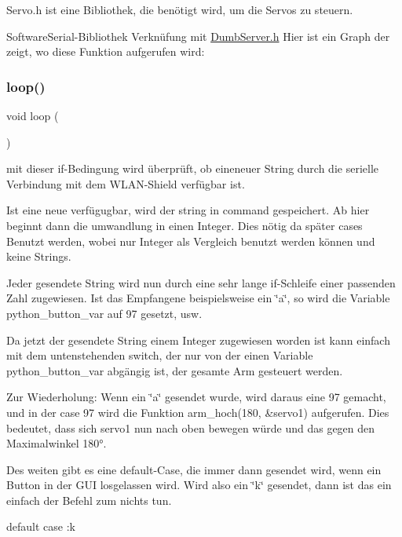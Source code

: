 Servo.\+h ist eine Bibliothek, die benötigt wird, um die Servos zu steuern. 

Software\+Serial-\/\+Bibliothek Verknüfung mit \hyperlink{_dumb_server_8h}{Dumb\+Server.\+h} Hier ist ein Graph der zeigt, wo diese Funktion aufgerufen wird\+:
\mbox{\label{_arduino__kommentiert_8ino_afe461d27b9c48d5921c00d521181f12f}} 
\subsubsection{\texorpdfstring{loop()}{loop()}}
{\footnotesize\ttfamily void loop (\begin{DoxyParamCaption}{ }\end{DoxyParamCaption})}

mit dieser if-\/\+Bedingung wird überprüft, ob eineneuer String durch die serielle Verbindung mit dem W\+L\+A\+N-\/\+Shield verfügbar ist.

Ist eine neue verfügugbar, wird der string in command gespeichert. Ab hier beginnt dann die umwandlung in einen Integer. Dies nötig da später cases Benutzt werden, wobei nur Integer als Vergleich benutzt werden können und keine Strings.

Jeder gesendete String wird nun durch eine sehr lange if-\/\+Schleife einer passenden Zahl zugewiesen. Ist das Empfangene beispielsweise ein \char`\"{}a\char`\"{}, so wird die Variable python\+\_\+button\+\_\+var auf 97 gesetzt, usw.

Da jetzt der gesendete String einem Integer zugewiesen worden ist kann einfach mit dem untenstehenden switch, der nur von der einen Variable python\+\_\+button\+\_\+var abgängig ist, der gesamte Arm gesteuert werden.

Zur Wiederholung\+: Wenn ein \char`\"{}a\char`\"{} gesendet wurde, wird daraus eine 97 gemacht, und in der case 97 wird die Funktion arm\+\_\+hoch(180, \&servo1) aufgerufen. Dies bedeutet, dass sich servo1 nun nach oben bewegen würde und das gegen den Maximalwinkel 180°.

Des weiten gibt es eine default-\/\+Case, die immer dann gesendet wird, wenn ein Button in der G\+UI losgelassen wird. Wird also ein \char`\"{}k\char`\"{} gesendet, dann ist das ein einfach der Befehl zum nichts tun.

default case \+:k

